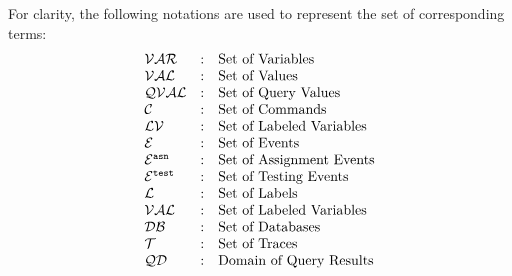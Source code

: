 For clarity, the following notations are used to represent the set of corresponding terms:
\[
\begin{array}{lll}
\mathcal{VAR} & : & \mbox{Set of Variables}  
\\ 
%
\mathcal{VAL} & : & \mbox{Set of Values} 
\\ 
%
\mathcal{QVAL} & : & \mbox{Set of Query Values} 
\\ 
%
\cdom & : & \mbox{Set of Commands} 
\\ 
%
\mathcal{LV} & : & \mbox{Set of Labeled Variables}
\\
%
\eventset  & : & \mbox{Set of Events}  
\\
%
\eventset^{\asn}  & : & \mbox{Set of Assignment Events}  
\\
%
\eventset^{\test}  & : & \mbox{Set of Testing Events}  
\\
%
\ldom  & : & \mbox{Set of Labels}  
\\
\mathcal{VAL}  & : & \mbox{Set of Labeled Variables}  
\\
\dbdom  & : & \mbox{{Set of Databases}} 
\\
%
{\mathcal{T}} & : & \mbox{Set of Traces}
\\
%
\qdom & : & \mbox{{Domain of Query Results}}\\
\end{array}
\]
